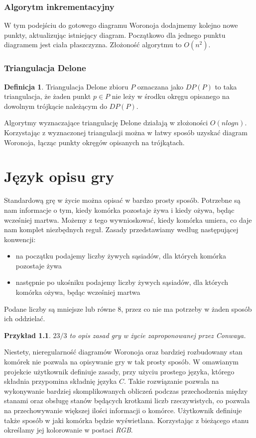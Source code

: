 \documentclass[declaration,shortabstract, inz]{iithesis}
\theoremstyle{definition} \newtheorem{definition}{Definicja}[]
\theoremstyle{plain} \newtheorem{remark}[definition]{Obserwacja}
\theoremstyle{plain} \newtheorem{theorem}[definition]{Twierdzenie}
\theoremstyle{plain} \newtheorem{example}{Przykład}[definition]
\theoremstyle{plain} \newtheorem{lemma}[definition]{Lemat}
\begin{document}
\subsection{Algorytm inkrementacyjny}

W tym podejściu do gotowego diagramu Woronoja dodajmemy kolejno nowe punkty, aktualizując istniejący diagram. Początkowo dla jednego punktu diagramem jest ciała płaszczyzna. Złożoność algorytmu to $O(n^2)$.

\subsection{Triangulacja Delone}

\begin{definition}
Triangulacja Delone zbioru $P$ oznaczana jako $DP(P)$ to taka triangulacja, że żaden punkt $p \in P$ nie leży w środku okręgu opisanego na dowolnym trójkącie należącym do $DP(P)$. 
\end{definition}

Algorytmy wyznaczające triangulację Delone działają w złożoności $O(nlogn)$.
Korzystając z wyznaczonej triangulacji można w łatwy sposób uzyskać diagram Woronoja, łącząc punkty okręgów opisanych na trójkątach. 

\chapter{Język opisu gry}
Standardową grę w życie można opisać w bardzo prosty sposób. Potrzebne są nam informacje o tym, kiedy komórka pozostaje żywa i kiedy ożywa, będąc wcześniej martwa. Możemy z tego wywnioskować, kiedy komórka umiera, co daje nam komplet niezbędnych reguł. Zasady przedstawiamy według następującej konwencji:
\begin{itemize}
\item na początku podajemy liczby żywych sąsiadów, dla których komórka pozostaje żywa
\item następnie po ukośniku podajemy liczby żywych sąsiadów, dla których komórka ożywa, będąc wcześniej martwa
\end{itemize}

Podane liczby są mniejsze lub równe $8$, przez co nie ma potrzeby w żaden sposób ich oddzielać.

\begin{example}
$23/3$ to opis zasad gry w życie zaproponowanej przez Conwaya.
\end{example}

Niestety, nieregularność diagramów Woronoja oraz bardziej rozbudowany stan komórek nie pozwala na opisywanie gry w tak prosty sposób. W omawianym projekcie użytkownik definiuje zasady, przy użyciu prostego języka, którego składnia przypomina składnię języka $C$. Takie rozwiązanie pozwala na wykonywanie bardziej skomplikowanych obliczeń podczas przechodzenia między stanami oraz obsługę stanów będących krotkami liczb rzeczywistych, co pozwala na przechowywanie większej ilości informacji o komórce. Użytkownik definiuje także sposób w jaki komórka będzie wyświetlana. Korzystając z bieżącego stanu określamy jej kolorowanie w postaci \textit{RGB}.
\end{document}
